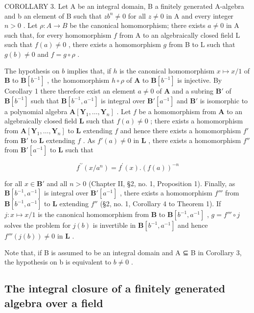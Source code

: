 COROLLARY 3. Let A be an integral domain, B a finitely generated A-algebra and b an element of B such that \(zb^n \neq 0\) for all \(z \neq 0\) in A and every integer \(n > 0\) . Let \(\rho: A \to B\) be the canonical homomorphism; there exists \(a \neq 0\) in A such that, for every homomorphism \(f\) from A to an algebraically closed field L such that \(f(a) \neq 0\) , there exists a homomorphism \(g\) from B to L such that \(g(b) \neq 0\) and \(f = g \circ \rho\) .

The hypothesis on \(b\) implies that, if \(h\) is the canonical homomorphism \(x \mapsto x / 1\) of \(\mathbf{B}\) to \(\mathbf{B}[b^{-1}]\) , the homomorphism \(h \circ \rho\) of \(\mathbf{A}\) to \(\mathbf{B}[b^{-1}]\) is injective. By Corollary 1 there therefore exist an element \(a \neq 0\) of \(\mathbf{A}\) and a subring \(\mathbf{B}'\) of \(\mathbf{B}[b^{-1}]\) such that \(\mathbf{B}[b^{-1}, a^{-1}]\) is integral over \(\mathbf{B}'[a^{-1}]\) and \(\mathbf{B}'\) is isomorphic to a polynomial algebra \(\mathbf{A}[\mathbf{Y}_1, \ldots, \mathbf{Y}_n]\) . Let \(f\) be a homomorphism from \(\mathbf{A}\) to an algebraically closed field \(\mathbf{L}\) such that \(f(a) \neq 0\) ; there exists a homomorphism from \(\mathbf{A}[\mathbf{Y}_1, \ldots, \mathbf{Y}_n]\) to \(\mathbf{L}\) extending \(f\) and hence there exists a homomorphism \(f'\) from \(\mathbf{B}'\) to \(\mathbf{L}\) extending \(f\) . As \(f'(a) \neq 0\) in \(\mathbf{L}\) , there exists a homomorphism \(f''\) from \(\mathbf{B}'[a^{-1}]\) to \(\mathbf{L}\) such that

\[
f ^ {\prime \prime} (x / a ^ {n}) = f ^ {\prime} (x). (f (a)) ^ {- n}
\]

for all \(x \in \mathbf{B}'\) and all \(n > 0\) (Chapter II, §2, no. 1, Proposition 1). Finally, as \(\mathbf{B}[b^{-1}, a^{-1}]\) is integral over \(\mathbf{B}'[a^{-1}]\) , there exists a homomorphism \(f'''\) from \(\mathbf{B}[b^{-1}, a^{-1}]\) to \(\mathbf{L}\) extending \(f''\) (§2, no. 1, Corollary 4 to Theorem 1). If \(j: x \mapsto x / 1\) is the canonical homomorphism from \(\mathbf{B}\) to \(\mathbf{B}[b^{-1}, a^{-1}]\) , \(g = f''' \circ j\) solves the problem for \(j(b)\) is invertible in \(\mathbf{B}[b^{-1}, a^{-1}]\) and hence \(f'''(j(b)) \neq 0\) in \(\mathbf{L}\) .

Note that, if B is assumed to be an integral domain and A ⊆ B in Corollary 3, the hypothesis on b is equivalent to \(b \neq 0\) .

\subsection{The integral closure of a finitely generated algebra over a field}

